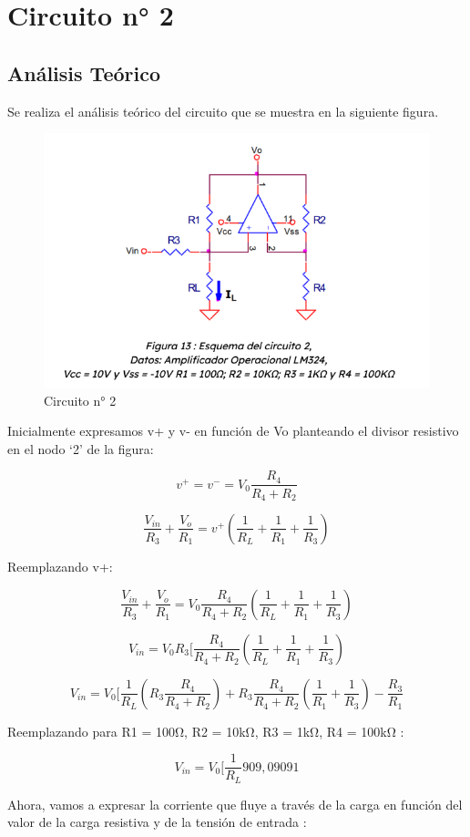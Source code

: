 \section{Circuito n° 2}

\subsection{Análisis Teórico}

Se realiza el análisis teórico del circuito que se muestra en la siguiente figura. 


\begin{figure}[h!]
    \centering
    \includegraphics[width=0.70\linewidth]{Secciones/Circuito2/imgCirc2.png}
    \caption{Circuito n° 2}
    \label{fig:enter-label}
\end{figure}


Inicialmente expresamos v+ y v- en función de Vo planteando el divisor resistivo en el nodo ‘2’ de la figura:

\[v^+ = v^- = V_0  \frac{R_4}{R_4 + R_2} \]

\[\frac{V_{in}}{R_3} + \frac{V_o}{R_1} = v^+ (\frac{1}{R_L}+\frac{1}{R_1}+\frac{1}{R_3}) \]

Reemplazando v+:

\[\frac{V_{in}}{R_3} + \frac{V_o}{R_1} = V_0  \frac{R_4}{R_4 + R_2} (\frac{1}{R_L}+\frac{1}{R_1}+\frac{1}{R_3})\]

\[{V_{in}} = V_0  R_3 [ \frac{R_4}{R_4 + R_2} (\frac{1}{R_L}+\frac{1}{R_1}+\frac{1}{R_3})\]

\[{V_{in}} = V_0 [ \frac{1}{R_L}(R_3 \frac{R_4}{R_4 + R_2}) + R_3\frac{R_4}{R_4 + R_2}(\frac{1}{R_1}+\frac{1}{R_3})-\frac{R_3}{R_1}\]

Reemplazando para R1 = 100Ω, R2 = 10kΩ, R3 = 1kΩ, R4 = 100kΩ :

\[{V_{in}} = V_0 [ \frac{1}{R_L}909,09091\]

Ahora, vamos a expresar la corriente que fluye a través de la carga en
función del valor de la carga resistiva y de la tensión de entrada :


